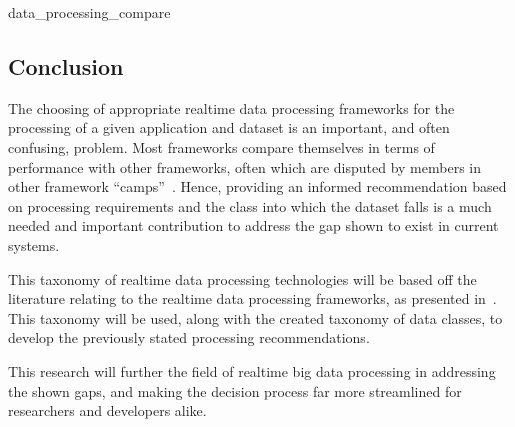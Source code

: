 {data_processing_compare}




\subsection{Conclusion} %
\label{sec:conclusion_litrev}

The choosing of appropriate realtime data processing frameworks for the processing of a given application and dataset
is an important, and often confusing, problem. Most frameworks compare themselves in terms of performance with other
frameworks, often which are disputed by members in other framework ``camps''~\cite{web_slideshare_b,web_slideshare_a}.
Hence, providing an informed recommendation based on processing requirements and the class into which the dataset
falls is a much needed and important contribution to address the gap shown to exist in current systems.

This taxonomy of realtime data processing technologies will be based off the literature relating to the realtime data
processing frameworks, as presented in~. This taxonomy will be used, along with the
created taxonomy of data classes, to develop the previously stated processing recommendations.

This research will further the field of realtime big data processing in addressing the shown gaps, and making the
decision process far more streamlined for researchers and developers alike.


